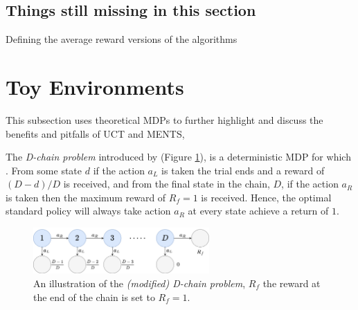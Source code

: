     \subsection{Things still missing in this section}
        Defining the average reward versions of the algorithms











\section{Toy Environments}
\label{sec:4-3-toyenvs}


    This subsection uses theoretical MDPs to further highlight and discuss the benefits and pitfalls of UCT and MENTS,  

    The \textit{D-chain problem} introduced by  (Figure \ref{fig:modified_d_chain}), is a deterministic MDP for which . From some state $d$ if the action $a_L$ is taken the trial ends and a reward of $(D-d)/D$ is received, and from the final state in the chain, $D$, if the action $a_R$ is taken then the maximum reward of $R_f=1$ is received. Hence, the optimal standard policy will always take action $a_R$ at every state achieve a return of $1$.
    \begin{figure}
        \centering
        \includegraphics[width=0.6\textwidth]{figures/temp/dchain.png}
        \caption[An illustration of the \textit{(modified) D-chain problem}.]{An illustration of the \textit{(modified) D-chain problem},  $R_f$   the reward at the end of the chain is set to $R_f=1$. }
        \label{fig:modified_d_chain}
    \end{figure}

